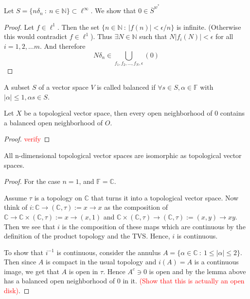 
\begin{example}
  Let $S = \{ n \delta_n  \ : \  n \in \mathbb{N} \} \subset
  \ell^\infty$. We show that $0 \in \overline{S}^{w^*}$
\end{example}
\begin{proof}
  Let $f \in \ell^1$. Then the set $\{ n \in \mathbb{N}  \ : \
  |f(n)| < \epsilon/n \}$ is infinite. (Otherwise this would
  contradict $f \in \ell^1$). Thus $\exists N \in \mathbb{N}$ such
  that $N|f_i(N)| < \epsilon$  for all $i = 1, 2, \ldots m$. And
  therefore $$N \delta_n \in \bigcup_{f_1 , f_2 , \ldots , f_N, \epsilon} (0)$$
\end{proof}

\begin{definition}
  A subset $S$ of a vector space $V$ is called  balanced if $\forall
  s \in S, \alpha \in \mathbb{F}$ with $|\alpha| \le 1, \alpha s \in S$.
\end{definition}

\begin{lemma}
  Let $X$ be a topological vector space, then every open neighborhood
  of ${0}$ contains a balanced open neighborhood of $O$.
\end{lemma}
\begin{proof}
  \textcolor{red}{verify}
\end{proof}

\begin{lemma}
  All n-dimensional topological vector spaces are isomorphic as
  topological vector spaces.
\end{lemma}
\begin{proof}
  For the case $n = 1$, and $\mathbb{F} = \mathbb{C}$.

  Assume $\tau$ is a topology on $\mathbb{C}$ that turns it into a
  topological vector space. Now think of $i : \mathbb{C} \to
  (\mathbb{C}, \tau) := x \to x$  as the composition of $\mathbb{C}
  \to \mathbb{C} \times (\mathbb{C} , \tau):= x \to (x, 1)$ and
  $\mathbb{C} \times (\mathbb{C} , \tau) \to (\mathbb{C} , \tau):=
  (x, y) \to xy$. Then we see  that $i$ is the composition of these
  maps which are continuous by the definition of the product topology
  and the TVS. Hence, $i$ is continuous.

  To show that $i^{-1}$ is continuous, consider the annulus $A = \{
  \alpha \in \mathbb{C}  \ : \  1 \le |\alpha| \le 2 \}$. Then since
  $A$ is compact in the usual topology and $i(A) = A$ is a continuous
  image, we get that $A$ is open in $\tau$. Hence $A^c \ni 0$ is open
  and by the lemma above has a balanced open neighborhood of $0$ in
  it. \textcolor{red}{(Show that this is actually an open disk)}.
\end{proof}

